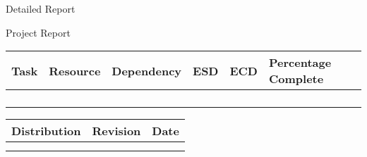 \documentclass[a4paper,12pt]{article}
\begin{document}
  \pagebreak
 
   
  

       \caption{Detailed Report}     
     \centering 
    \caption{Project Report}
      	\begin{tabular}{||l|l|c|c|l|l||}
	  \hline
	 {\bfseries Task} & {\bfseries Resource} &{\bfseries Dependency} &{\bfseries ESD} & {\bfseries ECD} & {\bfseries Percentage Complete} \\
	  \hline
       
	      &  &  &  &  &  \\
	  \hline
	      &  &  &  &  &  \\
	  \hline
	      &  &  &  &  &  \\
	  \hline
	      &  &  &  &  &  \\
	   \hline
	\end{tabular}
      
      
      
      
      \pagebreak

      \begin{tabular}{|p{5cm}|p{5cm}|p{2cm}|}
	\hline
	{\bfseries Distribution} & {\bfseries Revision} & {\bfseries Date} \\
	\hline
 
	      &  &  \\
	\hline
	      &  &  \\
	\hline
      \end{tabular}
\end{document}
